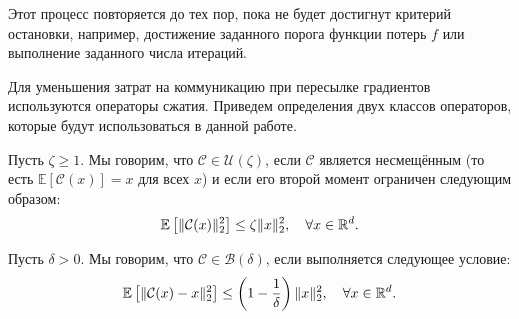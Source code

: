     Этот процесс повторяется до тех пор, пока не будет достигнут критерий остановки, например, достижение заданного порога функции потерь $f$ или выполнение заданного числа итераций.

    Для уменьшения затрат на коммуникацию при пересылке градиентов используются операторы сжатия. Приведем определения двух классов операторов, которые будут использоваться в данной работе.

    \begin{definition}
        Пусть $\zeta \geq 1$. Мы говорим, что $\mathcal{C} \in \mathcal{U}(\zeta)$, если $\mathcal{C}$ является несмещённым (то есть $\mathbb{E}[\mathcal{C}(x)] = x$ для всех $x$) и если его второй момент ограничен следующим образом:
        \begin{equation}
            \mathbb{E}\left[\|\mathcal{C}(x)\|_2^2\right] \leq \zeta \|x\|_2^2, \quad \forall x \in \mathbb{R}^d.
        \end{equation}
    \end{definition}

    \begin{definition}
        Пусть $\delta > 0$. Мы говорим, что $\mathcal{C} \in \mathcal{B}(\delta)$, если выполняется следующее условие:
        \begin{equation}
            \mathbb{E}\left[\|\mathcal{C}(x) - x\|_2^2\right] \leq \left(1 - \frac{1}{\delta}\right) \|x\|_2^2, \quad \forall x \in \mathbb{R}^d.
        \end{equation}
    \end{definition}

    